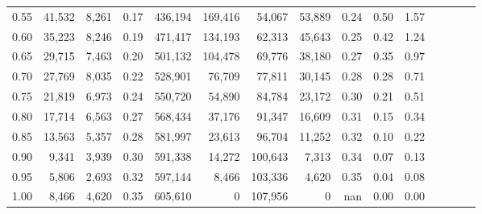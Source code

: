 \begin{tabular}{rrrcrrrrrrrrrrr}
0.55 &  41,532 &  8,261 &                                       0.17 &  436,194 &  169,416 &   54,067 &   53,889 &  0.24 &  0.50 &                         1.57 \\
0.60 &  35,223 &  8,246 &                                       0.19 &  471,417 &  134,193 &   62,313 &   45,643 &  0.25 &  0.42 &                         1.24 \\
0.65 &  29,715 &  7,463 &                                       0.20 &  501,132 &  104,478 &   69,776 &   38,180 &  0.27 &  0.35 &                         0.97 \\
0.70 &  27,769 &  8,035 &                                       0.22 &  528,901 &   76,709 &   77,811 &   30,145 &  0.28 &  0.28 &                         0.71 \\
0.75 &  21,819 &  6,973 &                                       0.24 &  550,720 &   54,890 &   84,784 &   23,172 &  0.30 &  0.21 &                         0.51 \\
0.80 &  17,714 &  6,563 &                                       0.27 &  568,434 &   37,176 &   91,347 &   16,609 &  0.31 &  0.15 &                         0.34 \\
0.85 &  13,563 &  5,357 &                                       0.28 &  581,997 &   23,613 &   96,704 &   11,252 &  0.32 &  0.10 &                         0.22 \\
0.90 &   9,341 &  3,939 &                                       0.30 &  591,338 &   14,272 &  100,643 &    7,313 &  0.34 &  0.07 &                         0.13 \\
0.95 &   5,806 &  2,693 &                                       0.32 &  597,144 &    8,466 &  103,336 &    4,620 &  0.35 &  0.04 &                         0.08 \\
1.00 &   8,466 &  4,620 &                                       0.35 &  605,610 &        0 &  107,956 &        0 &   nan &  0.00 &                         0.00 \\
\bottomrule
\end{tabular}
